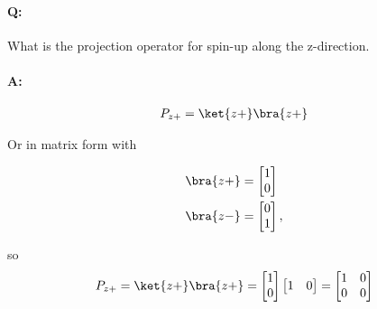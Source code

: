 \paragraph{Q:} What is the projection operator for spin-up along the z-direction.
\paragraph{A:}

\begin{equation}\label{eqn:PHY356HNov2:100}
\begin{aligned}
P_{z+} = \ket{z+}\bra{z+}
\end{aligned}
\end{equation}

Or in matrix form with

\begin{equation}\label{eqn:PHY356HNov2:105}
\begin{aligned}
\bra{z+} &=
\begin{bmatrix}
1 \\
0
\end{bmatrix} \\
\bra{z-} &=
\begin{bmatrix}
0 \\
1
\end{bmatrix},
\end{aligned}
\end{equation}

so
\begin{equation}\label{eqn:PHY356HNov2:110}
\begin{aligned}
P_{z+} = \ket{z+}\bra{z+} =
\begin{bmatrix}
1 \\
0
\end{bmatrix}
\begin{bmatrix}
1 & 0
\end{bmatrix}
=
\begin{bmatrix}
1 & 0 \\
0 & 0
\end{bmatrix}
\end{aligned}
\end{equation}

